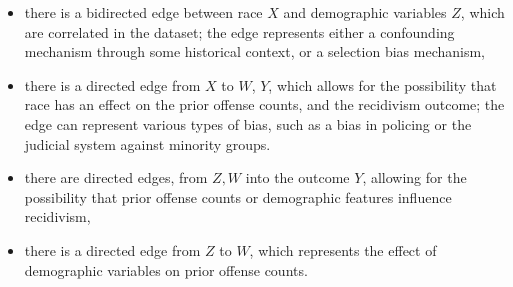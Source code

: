 \documentclass{article}
\providecommand{\tightlist}{%
  \setlength{\itemsep}{0pt}\setlength{\parskip}{0pt}}
\begin{document}
\begin{itemize}
\tightlist
\item
  there is a bidirected edge between race \(X\) and demographic
  variables \(Z\), which are correlated in the dataset; the edge
  represents either a confounding mechanism through some historical
  context, or a selection bias mechanism,
\item
  there is a directed edge from \(X\) to \(W\), \(Y\), which allows for
  the possibility that race has an effect on the prior offense counts,
  and the recidivism outcome; the edge can represent various types of
  bias, such as a bias in policing or the judicial system against
  minority groups.
\item
  there are directed edges, from \(Z, W\) into the outcome \(Y\),
  allowing for the possibility that prior offense counts or demographic
  features influence recidivism,
\item
  there is a directed edge from \(Z\) to \(W\), which represents the
  effect of demographic variables on prior offense counts.
\end{itemize}
\end{document}
